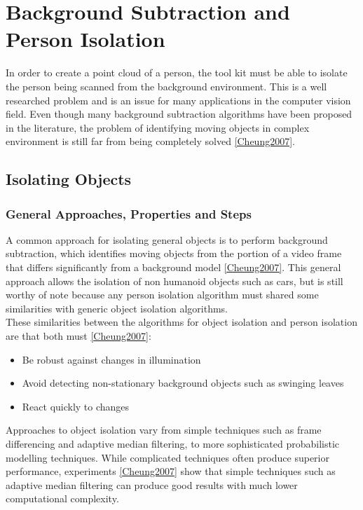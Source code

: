 \section{Background Subtraction and Person Isolation}
\label{background subtraction and person isolation}
In order to create a point cloud of a person, the tool kit must be able to isolate the person being scanned from the background environment. This is a well researched problem and is an issue for many applications in the computer vision field. Even though many background subtraction algorithms have been proposed in the literature, the problem of identifying moving objects in complex environment is still far from being completely solved \ref{Cheung2007}.\\

\subsection{Isolating Objects}
\label{isolating objects}

\subsubsection{General Approaches, Properties and Steps}
A common approach for isolating general objects is to perform background subtraction, which identifies moving objects from the portion of a video frame that differs significantly from a background model \ref{Cheung2007}.
This general approach allows the isolation of non humanoid objects such as cars, but is still worthy of note because any person isolation algorithm must shared some similarities with generic object isolation algorithms.\\

These similarities between the algorithms for object isolation and person isolation are that both must \ref{Cheung2007}:\begin{itemize}
  \item Be robust against changes in illumination
  \item Avoid detecting non-stationary background objects such as swinging leaves
  \item React quickly to changes
\end{itemize}

Approaches to object isolation vary from simple techniques such as frame differencing and adaptive median filtering, to more sophisticated probabilistic modelling techniques. 
While complicated techniques often produce superior performance, experiments \ref{Cheung2007} show that simple techniques such as adaptive median filtering can produce good results with much lower computational complexity.\\

